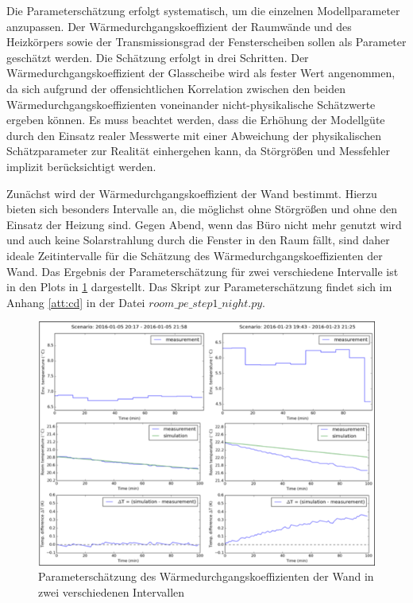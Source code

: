 Die Parameterschätzung erfolgt systematisch, um die einzelnen Modellparameter anzupassen. Der Wärmedurchgangskoeffizient der Raumwände und des Heizkörpers sowie der Transmissionsgrad der Fensterscheiben sollen als Parameter geschätzt werden. Die Schätzung erfolgt in drei Schritten. Der Wärmedurchgangskoeffizient der Glasscheibe wird als fester Wert angenommen, da sich aufgrund der offensichtlichen Korrelation zwischen den beiden Wärmedurchgangskoeffizienten voneinander nicht-physikalische Schätzwerte ergeben können. 
Es muss beachtet werden, dass die Erhöhung der Modellgüte durch den Einsatz realer Messwerte mit einer Abweichung der physikalischen Schätzparameter zur Realität einhergehen kann, da Störgrößen und Messfehler implizit berücksichtigt werden.

Zunächst wird der Wärmedurchgangskoeffizient der Wand bestimmt. Hierzu bieten sich besonders Intervalle an, die möglichst ohne Störgrößen und ohne den Einsatz der Heizung sind. Gegen Abend, wenn das Büro nicht mehr genutzt wird und auch keine Solarstrahlung durch die Fenster in den Raum fällt, sind daher ideale Zeitintervalle für die Schätzung des Wärmedurchgangskoeffizienten der Wand. Das Ergebnis der Parameterschätzung für zwei verschiedene Intervalle ist in den Plots in \ref{fig:step1} dargestellt. Das Skript zur Parameterschätzung findet sich im Anhang \ref{att:cd} in der Datei $room\_pe\_step1\_night.py$.

\begin{figure}
\centering
\includegraphics[width=\textwidth]{abbildungen/20160329_pestep1}
\caption{Parameterschätzung des Wärmedurchgangskoeffizienten der Wand in zwei verschiedenen Intervallen}
\label{fig:step1}
\end{figure}

